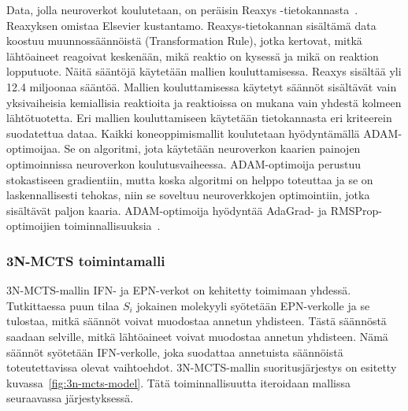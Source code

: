 \documentclass[finnish,twoside,censored,tkt,sw-line]{HYthesisML}
\begin{document}
Data, jolla neuroverkot koulutetaan, on peräisin Reaxys -tietokannasta~\cite{reaxys}.
Reaxyksen omistaa Elsevier kustantamo.
Reaxys-tietokannan sisältämä data koostuu muunnossäännöistä (Transformation Rule), jotka kertovat, mitkä lähtöaineet reagoivat keskenään, mikä reaktio on kysessä ja mikä on reaktion lopputuote.
Näitä sääntöjä käytetään mallien kouluttamisessa.
Reaxys sisältää yli 12.4 miljoonaa sääntöä.
Mallien kouluttamisessa käytetyt säännöt sisältävät vain yksivaiheisia kemiallisia reaktioita ja reaktioissa on mukana vain yhdestä kolmeen lähtötuotetta.
Eri mallien kouluttamiseen käytetään tietokannasta eri kriteerein suodatettua dataa.
Kaikki koneoppimismallit koulutetaan hyödyntämällä ADAM-optimoijaa.
Se on algoritmi, jota käytetään neuroverkon kaarien painojen optimoinnissa neuroverkon koulutusvaiheessa.
ADAM-optimoija perustuu stokastiseen gradientiin, mutta koska algoritmi on helppo toteuttaa ja se on laskennallisesti tehokas, niin se soveltuu neuroverkkojen optimointiin, jotka sisältävät paljon kaaria.
ADAM-optimoija hyödyntää AdaGrad- ja RMSProp-optimoijien toiminnallisuuksia~\cite{kingma2017adam}.

\subsubsection{3N-MCTS toimintamalli}

3N-MCTS-mallin IFN- ja EPN-verkot on kehitetty toimimaan yhdessä.
Tutkittaessa puun tilaa \(S_i\) jokainen molekyyli syötetään EPN-verkolle ja se tulostaa, mitkä säännöt voivat muodostaa annetun yhdisteen.
Tästä säännöstä saadaan selville, mitkä lähtöaineet voivat muodostaa annetun yhdisteen.
Nämä säännöt syötetään IFN-verkolle, joka suodattaa annetuista säännöistä toteutettavissa olevat vaihtoehdot.
3N-MCTS-mallin suoritusjärjestys on esitetty kuvassa~\ref{fig:3n-mcts-model}.
Tätä toiminnallisuutta iteroidaan mallissa seuraavassa järjestyksessä.
\end{document}

